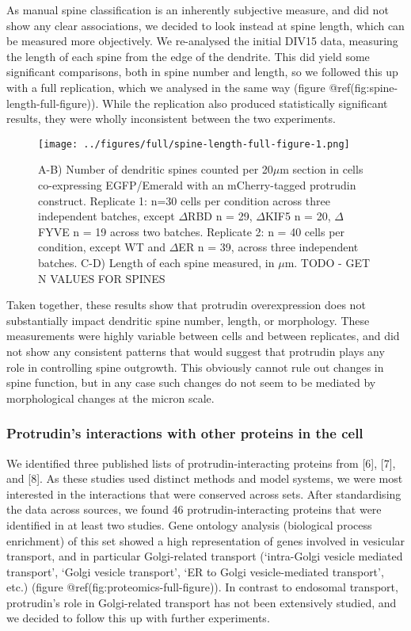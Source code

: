 \documentclass[
  12pt,
  a4paper,
]{article}
\begin{document}
As manual spine classification is an inherently subjective measure, and
did not show any clear associations, we decided to look instead at spine
length, which can be measured more objectively. We re-analysed the
initial DIV15 data, measuring the length of each spine from the edge of
the dendrite. This did yield some significant comparisons, both in spine
number and length, so we followed this up with a full replication, which
we analysed in the same way (figure @ref(fig:spine-length-full-figure)).
While the replication also produced statistically significant results,
they were wholly inconsistent between the two experiments.

\begin{figure}
\centering
\texttt{[image: ../figures/full/spine-length-full-figure-1.png]}
\caption{A-B) Number of dendritic spines counted per 20\(\mu\)m section
in cells co-expressing EGFP/Emerald with an mCherry-tagged protrudin
construct. Replicate 1: n=30 cells per condition across three
independent batches, except \(\Delta\)RBD n = 29, \(\Delta\)KIF5 n = 20,
\(\Delta\)FYVE n = 19 across two batches. Replicate 2: n = 40 cells per
condition, except WT and \(\Delta\)ER n = 39, across three independent
batches. C-D) Length of each spine measured, in \(\mu\)m. TODO - GET N
VALUES FOR SPINES}
\end{figure}

Taken together, these results show that protrudin overexpression does
not substantially impact dendritic spine number, length, or morphology.
These measurements were highly variable between cells and between
replicates, and did not show any consistent patterns that would suggest
that protrudin plays any role in controlling spine outgrowth. This
obviously cannot rule out changes in spine function, but in any case
such changes do not seem to be mediated by morphological changes at the
micron scale.

\hypertarget{GO-analysis}{%
\subsubsection{Protrudin's interactions with other proteins in the
cell}\label{GO-analysis}}

We identified three published lists of protrudin-interacting proteins
from {[}6{]}, {[}7{]}, and {[}8{]}. As these studies used distinct
methods and model systems, we were most interested in the interactions
that were conserved across sets. After standardising the data across
sources, we found 46 protrudin-interacting proteins that were identified
in at least two studies. Gene ontology analysis (biological process
enrichment) of this set showed a high representation of genes involved
in vesicular transport, and in particular Golgi-related transport
(`intra-Golgi vesicle mediated transport', `Golgi vesicle transport',
`ER to Golgi vesicle-mediated transport', etc.) (figure
@ref(fig:proteomics-full-figure)). In contrast to endosomal transport,
protrudin's role in Golgi-related transport has not been extensively
studied, and we decided to follow this up with further experiments.
\end{document}
